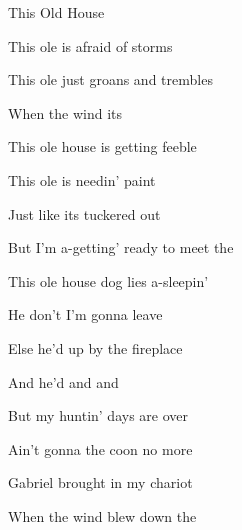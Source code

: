 \begin{SBSong}{This Old House}
\begin{SBVerse}
	This ole  is afraid of storms
	
	This ole  just groans and trembles
	
	When the  wind  its 
	
	This ole house is getting feeble
	
	This ole  is needin' paint
	
	Just like  its tuckered out
	
	But I'm a-getting' ready to meet the 
  \end{SBVerse}
  \begin{SBVerse}
	This ole house dog lies a-sleepin'
	
	He don't  I'm gonna leave
	
	Else he'd  up by the fireplace
	
	And he'd  and  and 
	
	But my huntin' days are over
	
	Ain't gonna  the coon no more
	
	Gabriel  brought in my chariot
	
	When the wind blew down the 
  \end{SBVerse}
\end{SBSong}




